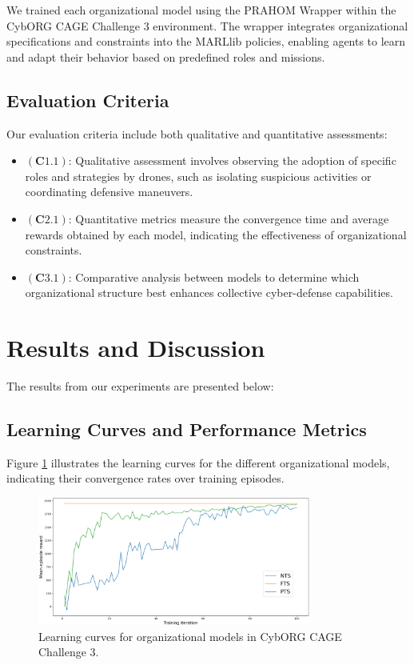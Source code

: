 \documentclass[conference]{IEEEtran}
\begin{document}
We trained each organizational model using the PRAHOM Wrapper within the CybORG CAGE Challenge 3 environment. The wrapper integrates organizational specifications and constraints into the MARLlib policies, enabling agents to learn and adapt their behavior based on predefined roles and missions.

\subsection{Evaluation Criteria}

Our evaluation criteria include both qualitative and quantitative assessments:

\begin{itemize}
    \item $(\mathbf{C1.1})$: Qualitative assessment involves observing the adoption of specific roles and strategies by drones, such as isolating suspicious activities or coordinating defensive maneuvers.
    \item $(\mathbf{C2.1})$: Quantitative metrics measure the convergence time and average rewards obtained by each model, indicating the effectiveness of organizational constraints.
    \item $(\mathbf{C3.1})$: Comparative analysis between models to determine which organizational structure best enhances collective cyber-defense capabilities.
\end{itemize}

\section{Results and Discussion}

The results from our experiments are presented below:

\subsection{Learning Curves and Performance Metrics}

Figure \ref{fig:learning_curves} illustrates the learning curves for the different organizational models, indicating their convergence rates over training episodes.

\begin{figure}[ht]
    \centering
    \includegraphics[width=0.8\textwidth]{figures/prahom_learning_curve.png}
    \caption{Learning curves for organizational models in CybORG CAGE Challenge 3.}
    \label{fig:learning_curves}
\end{figure}
\end{document}
